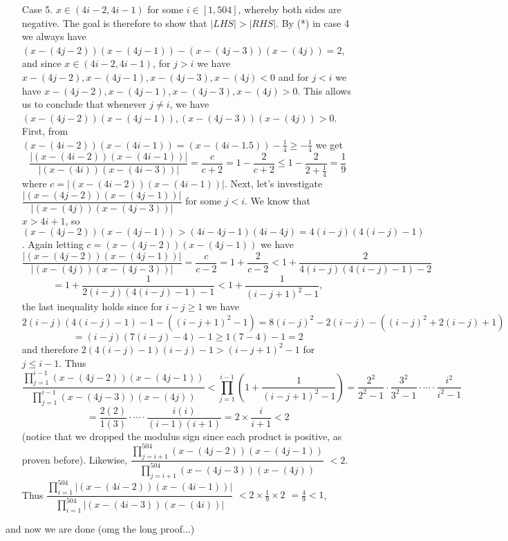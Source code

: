 \documentclass[11pt,a4paper]{article}
\begin{document}
\begin{itemize}
\begin{itemize}
\item [Case 5.]
$x\in (4i-2, 4i-1)$ for some $i\in [1, 504]$, whereby both sides are negative. 
The goal is therefore to show that $|LHS|>|RHS|$.  
By (*) in case 4 we always have 
$(x-(4j-2))(x-(4j-1))-(x-(4j-3))(x-(4j))=2$, 
and since $x\in (4i-2, 4i-1)$, for $j > i$ we have $x-(4j-2), x-(4j-1), x-(4j-3), x-(4j)<0$ and 
for $j<i$ we have $x-(4j-2), x-(4j-1), x-(4j-3), x-(4j)>0$. 
This allows us to conclude that whenever $j\neq i$, we have 
$(x-(4j-2))(x-(4j-1)), (x-(4j-3))(x-(4j))>0$. 
First, from $(x-(4i-2))(x-(4i-1))=(x-(4i-1.5))-\frac 14\ge -\frac 14$ we get 
\[\frac{|(x-(4i-2))(x-(4i-1))|}{|(x-(4i))(x-(4i-3))|}=\frac{c}{c+2}=1-\frac{2}{c+2}\le 1-\frac 2{2+\frac 14}=\frac 19\] 
where $c=|(x-(4i-2))(x-(4i-1))|.$
Next, let's investigate $\dfrac{|(x-(4j-2))(x-(4j-1))|}{|(x-(4j))(x-(4j-3))|}$ 
for some $j<i$. 
We know that $x>4i+1$, so 
$(x-(4j-2))(x-(4j-1))> (4i-4j-1)(4i-4j)=4(i-j)(4(i-j)-1)$. 
Again letting $c= (x-(4j-2))(x-(4j-1))$ we have 
\[\frac{|(x-(4j-2))(x-(4j-1))|}{|(x-(4j))(x-(4j-3))|}
=\frac{c}{c-2}
=1+\frac 2{c-2}
<1+\frac 2{4(i-j)(4(i-j)-1)-2}\]
\[=1+\frac 1{2(i-j)(4(i-j)-1)-1}
<1+\frac 1{(i-j+1)^2-1},\]
the last inequality holds since for $i-j\ge 1$ we have 
\[2(i-j)(4(i-j)-1)-1-((i-j+1)^2-1)
=8(i-j)^2-2(i-j)-((i-j)^2+2(i-j)+1)\]
\[=(i-j)(7(i-j)-4)-1
\ge 1(7-4)-1=2\]
and therefore $2(4(i-j)-1)(i-j)-1>(i-j+1)^2-1$ for $j\le i-1$.
Thus 
\[\dfrac{\displaystyle\prod_{j=1}^{i-1} (x-(4j-2))(x-(4j-1))}{\displaystyle\prod_{j=1}^{i-1} (x-(4j-3))(x-(4j))}
<\displaystyle\prod_{j=1}^{i-1}\left(1+\frac 1{(i-j+1)^2-1}\right)
=\frac{2^2}{2^2-1}\cdot\frac{3^2}{3^2-1}\cdot\cdots\cdot \frac{i^2}{i^2-1}\]
\[=\frac{2(2)}{1(3)}\cdot\cdots\cdot \frac{i(i)}{(i-1)(i+1)}
=2\times\frac{i}{i+1}<2\]
(notice that we dropped the modulus sign since each product is positive, as proven before).  
Likewise, $\dfrac{\displaystyle\prod_{j=i+1}^{504} (x-(4j-2))(x-(4j-1))}{\displaystyle\prod_{j=i+1}^{504} (x-(4j-3))(x-(4j))}$
$<2$. 
Thus $\dfrac{\displaystyle\prod_{i=1}^{504} |(x-(4i-2))(x-(4i-1))|}{\displaystyle\prod_{i=1}^{504} |(x-(4i-3))(x-(4i))|}$
$<2\times \frac{1}{9}\times 2$
$=\frac 49<1$, 

\end{itemize}
and now we are done (omg the long proof...)

\end{itemize}

\newpage
\end{document}
